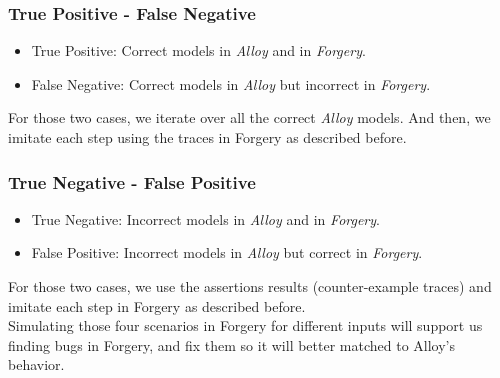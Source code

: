 \documentclass[oneside]{book}
\begin{document}

\subsubsection{True Positive - False Negative}
\begin{itemize}
  \item True Positive: Correct models in \textit{Alloy} and in \textit{Forgery}.
  \item False Negative: Correct models in \textit{Alloy} but incorrect in \textit{Forgery}.
\end{itemize}

For those two cases, we iterate over all the correct \textit{Alloy} models. And then, we imitate each step using the traces in Forgery as described before.

\subsubsection{True Negative - False Positive}
\begin{itemize}
  \item True Negative: Incorrect models in \textit{Alloy} and in \textit{Forgery}.
  \item False Positive: Incorrect models in \textit{Alloy} but correct in \textit{Forgery}.
\end{itemize}

For those two cases, we use the assertions results (counter-example traces) and imitate each step in Forgery as described before.\\

Simulating those four scenarios in Forgery for different inputs will support us finding bugs in Forgery, and fix them so it will better matched to Alloy's behavior.
\end{document}
